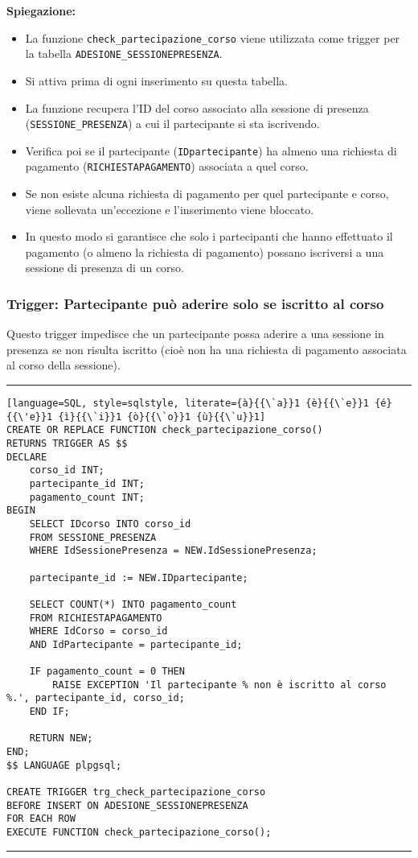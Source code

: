 \textbf{Spiegazione:}
\begin{itemize}
    \item La funzione \texttt{check\_partecipazione\_corso} viene utilizzata come trigger per la tabella \texttt{ADESIONE\_SESSIONEPRESENZA}.
    \item Si attiva prima di ogni inserimento su questa tabella.
    \item La funzione recupera l’ID del corso associato alla sessione di presenza (\texttt{SESSIONE\_PRESENZA}) a cui il partecipante si sta iscrivendo.
    \item Verifica poi se il partecipante (\texttt{IDpartecipante}) ha almeno una richiesta di pagamento (\texttt{RICHIESTAPAGAMENTO}) associata a quel corso.
    \item Se non esiste alcuna richiesta di pagamento per quel partecipante e corso, viene sollevata un’eccezione e l’inserimento viene bloccato.
    \item In questo modo si garantisce che solo i partecipanti che hanno effettuato il pagamento (o almeno la richiesta di pagamento) possano iscriversi a una sessione di presenza di un corso.
\end{itemize}
\subsubsection{Trigger: Partecipante può aderire solo se iscritto al corso}

Questo trigger impedisce che un partecipante possa aderire a una sessione in presenza se non risulta iscritto (cioè non ha una richiesta di pagamento associata al corso della sessione).

\noindent\rule{\textwidth}{0.4pt}
\begin{lstlisting}[language=SQL, style=sqlstyle, literate={à}{{\`a}}1 {è}{{\`e}}1 {é}{{\'e}}1 {ì}{{\`i}}1 {ò}{{\`o}}1 {ù}{{\`u}}1]
CREATE OR REPLACE FUNCTION check_partecipazione_corso()
RETURNS TRIGGER AS $$
DECLARE
    corso_id INT;
    partecipante_id INT;
    pagamento_count INT;
BEGIN
    SELECT IDcorso INTO corso_id
    FROM SESSIONE_PRESENZA
    WHERE IdSessionePresenza = NEW.IdSessionePresenza;

    partecipante_id := NEW.IDpartecipante;

    SELECT COUNT(*) INTO pagamento_count
    FROM RICHIESTAPAGAMENTO
    WHERE IdCorso = corso_id
    AND IdPartecipante = partecipante_id;

    IF pagamento_count = 0 THEN
        RAISE EXCEPTION 'Il partecipante % non è iscritto al corso %.', partecipante_id, corso_id;
    END IF;

    RETURN NEW;
END;
$$ LANGUAGE plpgsql;

CREATE TRIGGER trg_check_partecipazione_corso
BEFORE INSERT ON ADESIONE_SESSIONEPRESENZA
FOR EACH ROW
EXECUTE FUNCTION check_partecipazione_corso();
\end{lstlisting}
\noindent\rule{\textwidth}{0.4pt}

